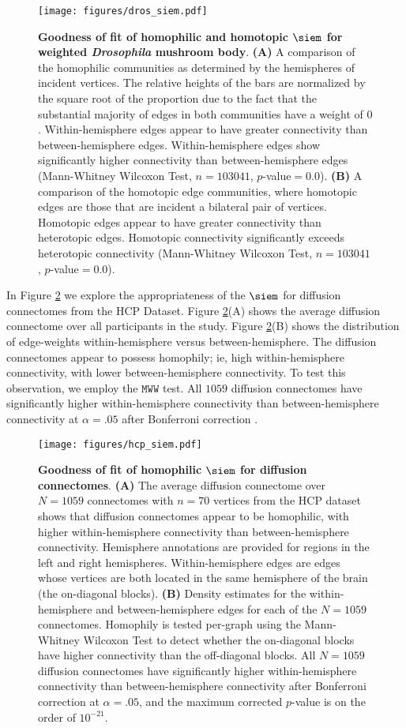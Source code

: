\begin{figure}
    \centering
    \texttt{[image: figures/dros\_siem.pdf]}
    \caption{\textbf{Goodness of fit of homophilic and homotopic $\siem$ for weighted \textit{Drosophila} mushroom body}. \textbf{(A)} A comparison of the homophilic communities as determined by the hemispheres of incident vertices. The relative heights of the bars are normalized by the square root of the proportion due to the fact that the substantial majority of edges in both communities have a weight of $0$. Within-hemisphere edges appear to have greater connectivity than between-hemisphere edges. Within-hemisphere edges show significantly higher connectivity than between-hemisphere edges (Mann-Whitney Wilcoxon Test, $n=103041$, $p$-value$=0.0$). \textbf{(B)} A comparison of the homotopic edge communities, where homotopic edges are those that are incident a bilateral pair of vertices. Homotopic edges appear to have greater connectivity than heterotopic edges. Homotopic connectivity significantly exceeds heterotopic connectivity (Mann-Whitney Wilcoxon Test, $n=103041$, $p$-value$=0.0$).}
    \label{fig:dros_siem}
\end{figure}

In Figure \ref{fig:siem_os_mri} we explore the appropriateness of the $\siem$ for diffusion connectomes from the HCP Dataset. Figure \ref{fig:siem_os_mri}(A) shows the average diffusion connectome over all participants in the study. Figure \ref{fig:siem_os_mri}(B) shows the distribution of edge-weights within-hemisphere versus between-hemisphere. The diffusion connectomes appear to possess homophily; ie, high within-hemisphere connectivity, with lower between-hemisphere connectivity. To test this observation, we employ the $\texttt{MWW}$ test. All $1059$ diffusion connectomes have significantly higher within-hemisphere connectivity than between-hemisphere connectivity at $\alpha=.05$ after Bonferroni correction \cite{Bonferroni1936-ip}.

\begin{figure}
    \centering
    \texttt{[image: figures/hcp\_siem.pdf]}
    \caption{\textbf{Goodness of fit of homophilic $\siem$ for diffusion connectomes}. \textbf{(A)} The average diffusion connectome over $N=1059$ connectomes with $n=70$ vertices from the HCP dataset shows that diffusion connectomes appear to be homophilic, with higher within-hemisphere connectivity than between-hemisphere connectivity. Hemisphere annotations are provided for regions in the left and right hemispheres. Within-hemisphere edges are edges whose vertices are both located in the same hemisphere of the brain (the on-diagonal blocks). \textbf{(B)} Density estimates for the within-hemisphere and between-hemisphere edges for each of the $N=1059$ connectomes. Homophily is tested per-graph using the Mann-Whitney Wilcoxon Test to detect whether the on-diagonal blocks have higher connectivity than the off-diagonal blocks. All $N=1059$ diffusion connectomes have significantly higher within-hemisphere connectivity than between-hemisphere connectivity after Bonferroni correction at $\alpha=.05$, and the maximum corrected $p$-value is on the order of $10^{-21}$.}
    \label{fig:siem_os_mri}
\end{figure}

